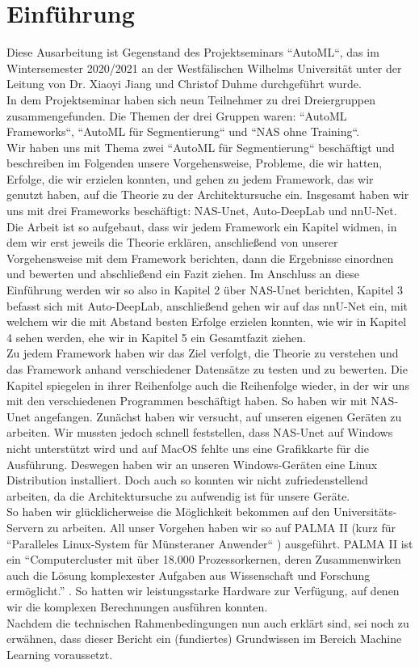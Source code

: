 \chapter{Einführung}
\label{ch:intro}

Diese Ausarbeitung ist Gegenstand des Projektseminars ``AutoML``, das im Wintersemester 2020/2021 an der Westfälischen Wilhelms Universität unter der Leitung von Dr. Xiaoyi Jiang und Christof Duhme durchgeführt wurde.\\
In dem Projektseminar haben sich neun Teilnehmer zu drei Dreiergruppen zusammengefunden. Die Themen der drei Gruppen waren: ``AutoML Frameworks``, ``AutoML für Segmentierung`` und ``NAS ohne Training``.\\
Wir haben uns mit Thema zwei ``AutoML für Segmentierung`` beschäftigt und beschreiben im Folgenden unsere Vorgehensweise, Probleme, die wir hatten, Erfolge, die wir erzielen konnten, und gehen zu jedem Framework, das wir genutzt haben, auf die Theorie zu der Architektursuche ein. Insgesamt haben wir uns mit drei Frameworks beschäftigt: NAS-Unet, Auto-DeepLab und nnU-Net. Die Arbeit ist so aufgebaut, dass wir jedem Framework ein Kapitel widmen, in dem wir erst jeweils die Theorie erklären, anschließend von unserer Vorgehensweise mit dem Framework berichten, dann die Ergebnisse einordnen und bewerten und abschließend ein Fazit ziehen. Im Anschluss an diese Einführung werden wir so also in Kapitel 2 über NAS-Unet berichten, Kapitel 3 befasst sich mit Auto-DeepLab, anschließend gehen wir auf das nnU-Net ein, mit welchem wir die mit Abstand besten Erfolge erzielen konnten, wie wir in Kapitel 4 sehen werden, ehe wir in Kapitel 5 ein Gesamtfazit ziehen.\\
Zu jedem Framework haben wir das Ziel verfolgt, die Theorie zu verstehen und das Framework anhand verschiedener Datensätze zu testen und zu bewerten. Die Kapitel spiegelen in ihrer Reihenfolge auch die Reihenfolge wieder, in der wir uns mit den verschiedenen Programmen beschäftigt haben. So haben wir mit NAS-Unet angefangen. Zunächst haben wir versucht, auf unseren eigenen Geräten zu arbeiten. Wir mussten jedoch schnell feststellen, dass NAS-Unet auf Windows nicht unterstützt wird und auf MacOS fehlte uns eine Grafikkarte für die Ausführung. Deswegen haben wir an unseren Windows-Geräten eine Linux Distribution installiert. Doch auch so konnten wir nicht zufriedenstellend arbeiten, da die Architektursuche zu aufwendig ist für unsere Geräte.\\ So haben wir glücklicherweise die Möglichkeit bekommen auf den Universitäts-Servern zu arbeiten. All unser Vorgehen haben wir so auf PALMA II (kurz für ``Paralleles Linux-System für Münsteraner Anwender`` \cite{palmaII}) ausgeführt. PALMA II ist ein \enquote{Computercluster mit über 18.000 Prozessorkernen, deren Zusammenwirken auch die Lösung komplexester Aufgaben aus Wissenschaft und Forschung ermöglicht.} \cite{palmaII}. So hatten wir leistungsstarke Hardware zur Verfügung, auf denen wir die komplexen Berechnungen ausführen konnten.\\
Nachdem die technischen Rahmenbedingungen nun auch erklärt sind, sei noch zu erwähnen, dass dieser Bericht ein (fundiertes) Grundwissen im Bereich Machine Learning voraussetzt.

